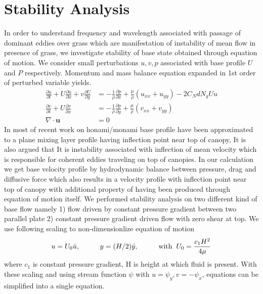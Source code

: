 \documentclass[aps,preprint,floatfix,prl]{revtex4-1}
\newcommand{\bu}{\mathbf{u}}
\newcommand{\del}{\partial}
\begin{document}
\section{Stability Analysis}
 In order to understand frequency and wavelength associated with passage of dominant eddies over grass which are manifestation of instability of mean flow 
in presence of grass, we investigate stability of base state obtained through equation of motion. We consider small perturbations $u, v, p$  associated 
with base profile $U$ and $P$ respectively. Momentum and mass balance equation expanded in 1st order of perturbed variable yields.
\begin{equation}
\begin{split}
 \frac{\del u}{\del t}+U\frac{\del u}{\del x}+v\frac{\del U}{\del y} &= -\frac{1}{\rho}\frac{\del p}{\del x}+\frac{\mu}{\rho}(u_{xx}+u_{yy})-2C_{N}dN_{g}Uu\\
 \frac{\del v}{\del  t}+ U\frac{\del v}{\del x} &= -\frac{1}{\rho}\frac{\del p}{\del y}+\frac{\mu}{\rho}(v_{xx}+v_{yy})\\
 \nabla\cdot \bu &= 0
\end{split}
\end{equation}
In most of recent work on honami/monami base profile have been approximated to a plane mixing layer profile having inflection point near top of canopy, It is also argued that 
It is instability associated with inflection of mean velocity which is responsible for coherent eddies traveling on top of canopies. In our calculation we get base velocity
profile by hydrodynamic balance between pressure, drag and diffusive force which also results in a velocity profile with inflection point near top of canopy with additional property 
of having been produced through equation of motion itself.\newline
We performed stability analysis on two different kind of base flow namely 1) flow driven by constant pressure gradient between two parallel plate  2) constant pressure gradient driven 
flow with zero shear at top. We use following scaling to non-dimensionlize equation of motion
   \[ u = U_{0}\bar{u},\hspace{1cm} y = (H/2)\bar{y}, \hspace{1cm} \text{with}\hspace{2mm} U_{0}=\frac{c_{1}H^2}{4\mu} \]
where $c_{1}$ is constant pressure gradient, H is height at which fluid is present. With these scaling and using stream function $\psi$ with $u = \psi_{y}, v= -\psi_x$, equations 
can be simplified into a single equation.
\end{document}
